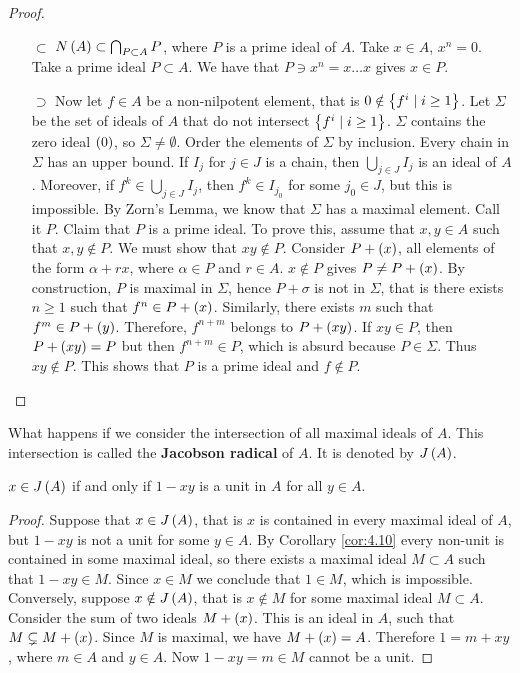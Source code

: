 \begin{proof}
\hfill
\begin{itemize}
\item[$ \subset $] $ N\left( A \right) \subset \bigcap_{P \subset A} P $, where $ P $ is a prime ideal of $ A $. Take $ x \in A $, $ x^n = 0 $. Take a prime ideal $ P \subset A $. We have that $ P \ni x^n = x \dots x $ gives $ x \in P $.
\item[$ \supset $] Now let $ f \in A $ be a non-nilpotent element, that is $ 0 \notin \left\{ f^i \mid i \ge 1 \right\} $. Let $ \Sigma $ be the set of ideals of $ A $ that do not intersect $ \left\{ f^i \mid i \ge 1 \right\} $. $ \Sigma $ contains the zero ideal $ \left( 0 \right) $, so $ \Sigma \ne \emptyset $. Order the elements of $ \Sigma $ by inclusion. Every chain in $ \Sigma $ has an upper bound. If $ I_j $ for $ j \in J $ is a chain, then $ \bigcup_{j \in J} I_j $ is an ideal of $ A $. Moreover, if $ f^k \in \bigcup_{j \in J} I_j $, then $ f^k \in I_{j_0} $ for some $ j_0 \in J $, but this is impossible. By Zorn's Lemma, we know that $ \Sigma $ has a maximal element. Call it $ P $. Claim that $ P $ is a prime ideal. To prove this, assume that $ x, y \in A $ such that $ x, y \notin P $. We must show that $ xy \notin P $. Consider $ P + \left( x \right) $, all elements of the form $ \alpha + rx $, where $ \alpha \in P $ and $ r \in A $. $ x \notin P $ gives $ P \ne P + \left( x \right) $. By construction, $ P $ is maximal in $ \Sigma $, hence $ P + \sigma $ is not in $ \Sigma $, that is there exists $ n \ge 1 $ such that $ f^n \in P + \left( x \right) $. Similarly, there exists $ m $ such that $ f^m \in P + \left( y \right) $. Therefore, $ f^{n + m} $ belongs to $ P + \left( xy \right) $. If $ xy \in P $, then $ P + \left( xy \right) = P $ but then $ f^{n + m} \in P $, which is absurd because $ P \in \Sigma $. Thus $ xy \notin P $. This shows that $ P $ is a prime ideal and $ f \notin P $.
\end{itemize}
\end{proof}

What happens if we consider the intersection of all maximal ideals of $ A $. This intersection is called the \textbf{Jacobson radical} of $ A $. It is denoted by $ J\left( A \right) $.

\begin{proposition}
\label{prop:5.3}
$ x \in J\left( A \right) $ if and only if $ 1 - xy $ is a unit in $ A $ for all $ y \in A $.
\end{proposition}

\begin{proof}
Suppose that $ x \in J\left( A \right) $, that is $ x $ is contained in every maximal ideal of $ A $, but $ 1 - xy $ is not a unit for some $ y \in A $. By Corollary \ref{cor:4.10} every non-unit is contained in some maximal ideal, so there exists a maximal ideal $ M \subset A $ such that $ 1 - xy \in M $. Since $ x \in M $ we conclude that $ 1 \in M $, which is impossible. Conversely, suppose $ x \notin J\left( A \right) $, that is $ x \notin M $ for some maximal ideal $ M \subset A $. Consider the sum of two ideals $ M + \left( x \right) $. This is an ideal in $ A $, such that $ M \subsetneq M + \left( x \right) $. Since $ M $ is maximal, we have $ M + \left( x \right) = A $. Therefore $ 1 = m + xy $, where $ m \in A $ and $ y \in A $. Now $ 1 - xy = m \in M $ cannot be a unit.
\end{proof}

